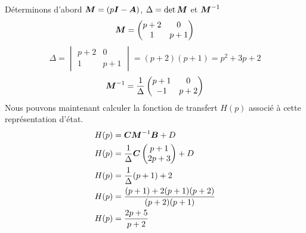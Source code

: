 Déterminons d'abord $\boldsymbol{M}=(p\boldsymbol{I}-\boldsymbol{A})$, $\Delta=\det{\boldsymbol{M}}$ et $\boldsymbol{M}^{-1}$
\[
    \boldsymbol{M}=
    \begin{pmatrix} 
        p+2 & 0\\
        1 & p+1 
    \end{pmatrix}
\]
\[
    \Delta=
    \begin{vmatrix} 
        p+2 & 0\\
        1 & p+1 
    \end{vmatrix}=(p+2)(p+1)=p^2+3p+2
\]
\[
    \boldsymbol{M}^{-1}=
    \dfrac{1}{\Delta}
    \begin{pmatrix} 
        p+1 & 0\\
        -1 & p+2 
    \end{pmatrix}
\]
Nous pouvons maintenant calculer la fonction de transfert $H(p)$ associé à
cette représentation d'état.
\begin{align*}
    H(p)&=\boldsymbol{C}\boldsymbol{M}^{-1}\boldsymbol{B}+D\\
    H(p)&=\dfrac{1}{\Delta}\boldsymbol{C}\begin{pmatrix}p+1\\2p+3\end{pmatrix}+D\\
    H(p)&=\dfrac{1}{\Delta}(p+1)+2\\
    H(p)&=\dfrac{(p+1)+2(p+1)(p+2)}{(p+2)(p+1)}\\
    H(p)&=\dfrac{2p+5}{p+2}
\end{align*}

